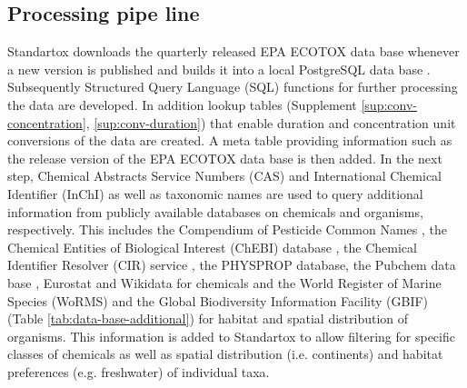 \subsection*{Processing pipe line}
Standartox downloads the quarterly released EPA ECOTOX data base whenever a new version is published and builds it into a local PostgreSQL data base \citep{szocs_build_2019}. Subsequently Structured Query Language (SQL) functions for further processing the data are developed. In addition lookup tables (Supplement \ref{sup:conv-concentration}, \ref{sup:conv-duration}) that enable duration and concentration unit conversions of the data are created. A meta table providing information such as the release version of the EPA ECOTOX data base is then added. In the next step, Chemical Abstracts Service Numbers (CAS) and International Chemical Identifier (InChI) as well as taxonomic names are used to query additional information from publicly available databases on chemicals and organisms, respectively. This includes the Compendium of Pesticide Common Names \citep{wood_compendium_2019}, the Chemical Entities of Biological Interest (ChEBI) database \citep{hastings_chebi_2016}, the Chemical Identifier Resolver (CIR) service \citep{nationalinstitutesofhealthnih_chemical_2019}, the PHYSPROP database, the Pubchem data base \citep{kim_pubchem_2016}, Eurostat \citep{europeancommission_eurostat_2019} and Wikidata \citep{vrandecic_wikidata_2014} for chemicals and the World Register of Marine Species (WoRMS) \citep{wormseditorialboard_world_2018} and the Global Biodiversity Information Facility (GBIF) \citep{_gbif_2019} (Table \ref{tab:data-base-additional}) for habitat and spatial distribution of organisms. This information is added to Standartox to allow filtering for specific classes of chemicals as well as spatial distribution (i.e. continents) and habitat preferences (e.g. freshwater) of individual taxa.



